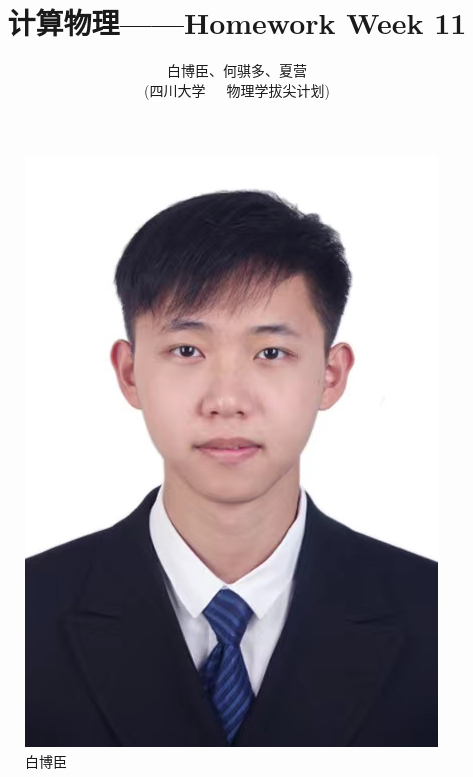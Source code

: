\documentclass[12pt,a4paper]{article}%
\title{\fontsize{18pt}{27pt}\selectfont%
    {\heiti%
        计算物理——Homework Week 11}}%
\author{\fontsize{12pt}{18pt}\selectfont%
    {\fangsong%
        白博臣、何骐多、夏营}\\%
    \fontsize{10.5pt}{15.75pt}\selectfont%
    {\fangsong%
        (四川大学~~~物理学拔尖计划)}}%
\date{}%
\begin{document}
\maketitle%
\lhead{}%
\chead{}%
\rhead{}%
\lfoot{}%
\cfoot{\thepage}%
\rfoot{}%
\begin{figure}[h]
    \centering
    \begin{minipage}{0.32\textwidth}
        \centering
        \includegraphics[width=\linewidth]{bbc}
        \caption{白博臣}
        \label{白博臣照片}
    \end{minipage}\hfill
    \begin{minipage}{0.305\textwidth}

\end{minipage}
\end{figure}
\end{document}
